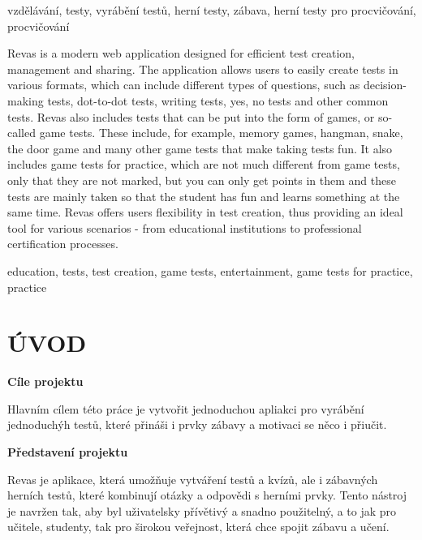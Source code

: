 \documentclass[12pt, a4paper, twoside, openright]{report}
\begin{document}
	\vspace{18pt}

	\noindent vzdělávání, testy, vyrábění testů, herní testy, zábava, herní testy pro procvičování, procvičování

	\vspace{18pt}
	Revas is a modern web application designed for efficient test creation, management and sharing. The application allows users to easily create tests in various formats, which can include different types of questions, such as decision-making tests, dot-to-dot tests, writing tests, yes, no tests and other common tests. Revas also includes tests that can be put into the form of games, or so-called game tests. These include, for example, memory games, hangman, snake, the door game and many other game tests that make taking tests fun. It also includes game tests for practice, which are not much different from game tests, only that they are not marked, but you can only get points in them and these tests are mainly taken so that the student has fun and learns something at the same time. Revas offers users flexibility in test creation, thus providing an ideal tool for various scenarios - from educational institutions to professional certification processes.

	\vspace{18pt}

	\noindent education, tests, test creation, game tests, entertainment, game tests for practice, practice

\newcommand{\introsubheading}[1]{%
  {\noindent\textbf{\normalsize #1}\vspace{1pt}\par}%
}
\chapter*{ÚVOD}

\introsubheading{Cíle projektu}
Hlavním cílem této práce je vytvořit jednoduchou apliakci pro vyrábění jednoduchýh testů, které přináši i prvky zábavy a motivaci se něco i přiučit.


\introsubheading{Představení projektu}
Revas je aplikace, která umožňuje vytváření testů a kvízů, ale i zábavných herních testů, které kombinují otázky a odpovědi s herními prvky. Tento nástroj je navržen tak, aby byl uživatelsky přívětivý a snadno použitelný, a to jak pro učitele, studenty, tak pro širokou veřejnost, která chce spojit zábavu a učení.
\end{document}

